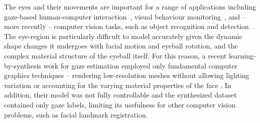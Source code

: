 The eyes and their movements are important for a range of applications including gaze-based human-computer interaction~\cite{majaranta14_apc}, visual behaviour monitoring~\cite{bulling13_chi,bulling11_pami}, and -- more recently -- computer vision tasks, such as object recognition and detection~\cite{yun2013studying,papadopoulos2014training,karthikeyan2013and}.
The eye-region is particularly difficult to model accurately given the dynamic shape changes it undergoes with facial motion and eyeball rotation, and the complex material structure of the eyeball itself.
For this reason, a recent learning-by-synthesis work for gaze estimation employed only fundamental computer graphics techniques -- rendering low-resolution meshes without allowing lighting variation or accounting for the varying material properties of the face \citet{sugano2014learning}.
In addition, their model was not fully controllable and the synthesized dataset contained only gaze labels, limiting its usefulness for other computer vision problems, such as facial landmark registration.





